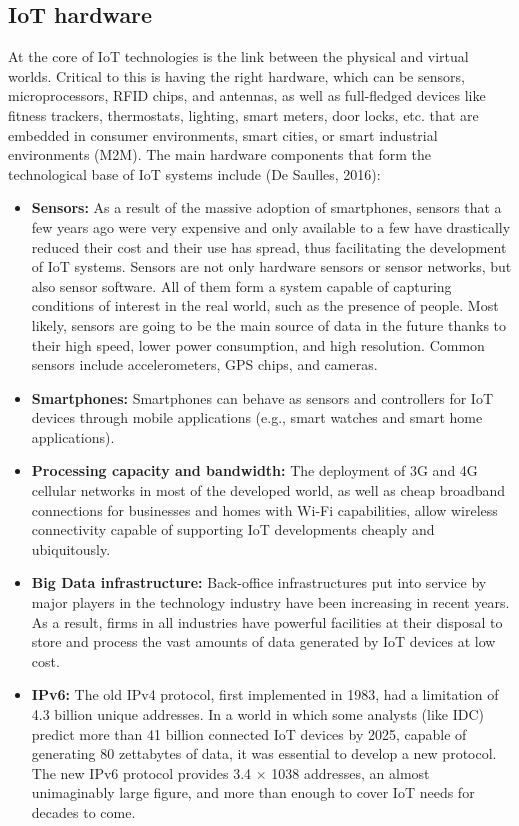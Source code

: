 \documentclass[
  letterpaper,
  DIV=11,
  numbers=noendperiod]{scrreprt}
\begin{document}
\hypertarget{iot-hardware}{%
\subsection{IoT hardware}\label{iot-hardware}}

At the core of IoT technologies is the link between the physical and
virtual worlds. Critical to this is having the right hardware, which can
be sensors, microprocessors, RFID chips, and antennas, as well as
full-fledged devices like fitness trackers, thermostats, lighting, smart
meters, door locks, etc. that are embedded in consumer environments,
smart cities, or smart industrial environments (M2M). The main hardware
components that form the technological base of IoT systems include (De
Saulles, 2016):

\begin{itemize}
\item
  \textbf{Sensors:} As a result of the massive adoption of smartphones,
  sensors that a few years ago were very expensive and only available to
  a few have drastically reduced their cost and their use has spread,
  thus facilitating the development of IoT systems. Sensors are not only
  hardware sensors or sensor networks, but also sensor software. All of
  them form a system capable of capturing conditions of interest in the
  real world, such as the presence of people. Most likely, sensors are
  going to be the main source of data in the future thanks to their high
  speed, lower power consumption, and high resolution. Common sensors
  include accelerometers, GPS chips, and cameras.
\item
  \textbf{Smartphones:} Smartphones can behave as sensors and
  controllers for IoT devices through mobile applications (e.g., smart
  watches and smart home applications).
\item
  \textbf{Processing capacity and bandwidth:} The deployment of 3G and
  4G cellular networks in most of the developed world, as well as cheap
  broadband connections for businesses and homes with Wi-Fi
  capabilities, allow wireless connectivity capable of supporting IoT
  developments cheaply and ubiquitously.
\item
  \textbf{Big Data infrastructure:} Back-office infrastructures put into
  service by major players in the technology industry have been
  increasing in recent years. As a result, firms in all industries have
  powerful facilities at their disposal to store and process the vast
  amounts of data generated by IoT devices at low cost.
\item
  \textbf{IPv6:} The old IPv4 protocol, first implemented in 1983, had a
  limitation of 4.3 billion unique addresses. In a world in which some
  analysts (like IDC) predict more than 41 billion connected IoT devices
  by 2025, capable of generating 80 zettabytes of data, it was essential
  to develop a new protocol. The new IPv6 protocol provides 3.4 × 1038
  addresses, an almost unimaginably large figure, and more than enough
  to cover IoT needs for decades to come.
\end{itemize}
\end{document}
